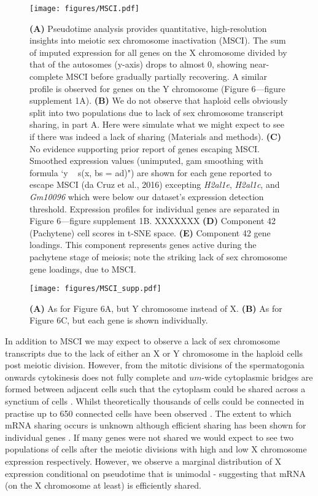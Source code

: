 \begin{figure}[H]
	\centering
	\texttt{[image: figures/MSCI.pdf]}
	\caption{
		\textbf{(A)} Pseudotime analysis provides quantitative, high-resolution insights into meiotic sex chromosome inactivation (MSCI). The sum of imputed expression for all genes on the X chromosome divided by that of the autosomes (y-axis) drops to almost 0, showing near-complete MSCI before gradually partially recovering. A similar profile is observed for genes on the Y chromosome (Figure 6—figure supplement 1A).
		\textbf{(B)} We do not observe that haploid cells obviously split into two populations due to lack of sex chromosome transcript sharing, in part A. Here were simulate what we might expect to see if there was indeed a lack of sharing (Materials and methods).
		\textbf{(C)} No evidence supporting prior report of genes escaping MSCI. Smoothed expression values (unimputed, gam smoothing with formula ‘y ~ s(x, bs = ad)") are shown for each gene reported to escape MSCI (da Cruz et al., 2016) excepting \textit{H2al1e}, \textit{H2al1c}, and \textit{Gm10096} which were below our dataset’s expression detection threshold. Expression profiles for individual genes are separated in Figure 6—figure supplement 1B. XXXXXXX
		\textbf{(D)} Component 42 (Pachytene) cell scores in t-SNE space.
		\textbf{(E)} Component 42 gene loadings. This component represents genes active during the pachytene stage of meiosis; note the striking lack of sex chromosome gene loadings, due to MSCI.
	}
	\label{fig:MSCI}
\end{figure}

\begin{figure}[H]
	\centering
	\texttt{[image: figures/MSCI\_supp.pdf]}
	\caption{
		\textbf{(A)} As for Figure 6A, but Y chromosome instead of X.
		\textbf{(B)} As for Figure 6C, but each gene is shown individually.}
	\label{fig:MSCI_supp}
\end{figure}


In addition to MSCI we may expect to observe a lack of sex chromosome transcripts due to the lack of either an X or Y chromosome in the haploid cells post meiotic division. However, from the mitotic divisions of the spermatogonia onwards cytokinesis does not fully complete and $um$-wide cytoplasmic bridges are formed between adjacent cells such that the cytoplasm could be shared across a synctium of cells \cite{Greenbaum2011Germ}. Whilst theoretically thousands of cells could be connected in practise up to 650 connected cells have been observed \cite{Ren1991Clonal}. The extent to which mRNA sharing occurs is unknown although efficient sharing has been shown for individual genes \cite{Braun1989Genetically}. If many genes were not shared we would expect to see two populations of cells after the meiotic divisions with high and low X chromosome expression respectively. However, we observe a marginal distribution of X expression conditional on pseudotime that is unimodal - suggesting that mRNA (on the X chromosome at least) is efficiently shared.

